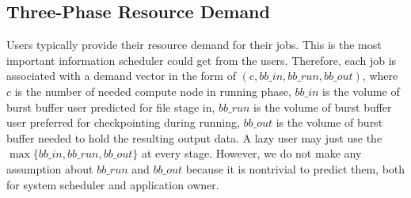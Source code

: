\subsection{Three-Phase Resource Demand}
Users typically provide their resource demand for their jobs.
This is the most important information scheduler could get from the users.
Therefore, each job is associated with a demand vector in the form of $(c, bb\_in, bb\_run, bb\_out)$,
where $c$ is the number of needed compute node in running phase,
$bb\_in$ is the volume of burst buffer user predicted for file stage in,
$bb\_run$ is the volume of burst buffer user preferred for checkpointing during running,
$bb\_out$ is the volume of burst buffer needed to hold the resulting output data.
A lazy user may just use the $\max\{bb\_in, bb\_run, bb\_out\}$ at every stage.
However, we do not make any assumption about $bb\_run$ and $bb\_out$ because it is nontrivial to predict them,
both for system scheduler and application owner.

